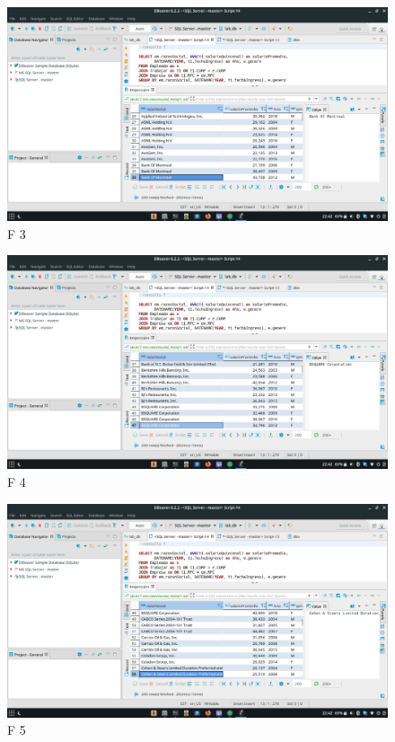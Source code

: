 \documentclass[a4paper, 12pt]{report}
\begin{document}
    \begin{figure}
        \includegraphics[width=\textwidth]
            {img/f3.jpeg}\hfill
    \caption{F 3}
    \end{figure}
    \begin{figure}
        \includegraphics[width=\textwidth]
            {img/f4.jpeg}\hfill
    \caption{F 4}
    \end{figure}
    \begin{figure}
        \includegraphics[width=\textwidth]
            {img/f5.jpeg}\hfill
    \caption{F 5}
    \end{figure}
\end{document}
